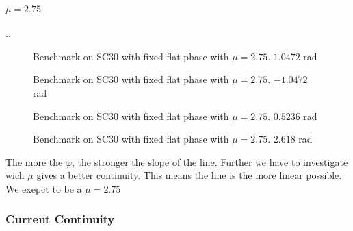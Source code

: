\documentclass[../main.tex]{subfiles}
\begin{document}
\paragraph{$\mu = 2.75$}..
\begin{figure}[H]
   \centering
   
   \caption{Benchmark on SC30 with fixed flat phase with $\mu = 2.75$. $1.0472$ rad }
   \label{fig:sc30_fixed_flat_phase}
\end{figure}
\begin{figure}[H]
   \centering
   
   \caption{Benchmark on SC30 with fixed flat phase with $\mu = 2.75$. $-1.0472$ rad}
   \label{fig:sc30_fixed_flat_phase}
\end{figure}
\begin{figure}[H]
   \centering
   
   \caption{Benchmark on SC30 with fixed flat phase with $\mu = 2.75$. $0.5236$ rad}
   \label{fig:sc30_fixed_flat_phase}
\end{figure}
\begin{figure}[H]
    \centering
    
    \caption{Benchmark on SC30 with fixed flat phase with $\mu = 2.75$. $2.618$ rad}
    \label{fig:sc30_fixed_flat_phase}
\end{figure}
The more the $\varphi$, the stronger the slope of the line. Further we have to investigate wich $\mu$ gives a better continuity.
This means the line is the more linear possible. We exepct to be a $\mu = 2.75$
\subsubsection{Current Continuity}
\end{document}
